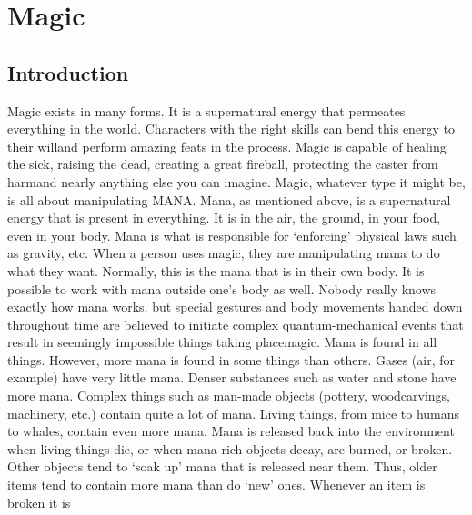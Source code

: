 \documentclass[twoside]{book}
\begin{document}
    

\chapter{Magic}
    
    

\section{Introduction}
      Magic exists in many forms. It is a supernatural
             energy that permeates everything in the world. Characters
             with the right skills can bend this energy to their
             willand perform amazing feats in the process. Magic
             is capable of healing the sick, raising the dead, creating a
             great fireball, protecting the caster from harmand
             nearly anything else you can imagine.   Magic, whatever type it might be, is all about
             manipulating MANA. Mana, as mentioned above, is a
             supernatural energy that is present in everything. It is in
             the air, the ground, in your food, even in your body. Mana
             is what is responsible for `enforcing' physical
             laws such as gravity, etc. When a person uses magic, they
             are manipulating mana to do what they want. Normally, this
             is the mana that is in their own body. It is possible to
             work with mana outside one's body as well. Nobody
             really knows exactly how mana works, but special gestures
             and body movements handed down throughout time are believed
             to initiate complex quantum-mechanical events that result in
             seemingly impossible things taking placemagic.
               Mana is found in all things. However, more mana is
             found in some things than others. Gases (air, for example)
             have very little mana. Denser substances such as water and
             stone have more mana. Complex things such as man-made
             objects (pottery, woodcarvings, machinery, etc.) contain
             quite a lot of mana. Living things, from mice to humans to
             whales, contain even more mana. Mana is released back into
             the environment when living things die, or when mana-rich
             objects decay, are burned, or broken. Other objects tend to
             `soak up' mana that is released near them. Thus,
             older items tend to contain more mana than do
             `new' ones. Whenever an item is broken it is
\end{document}
